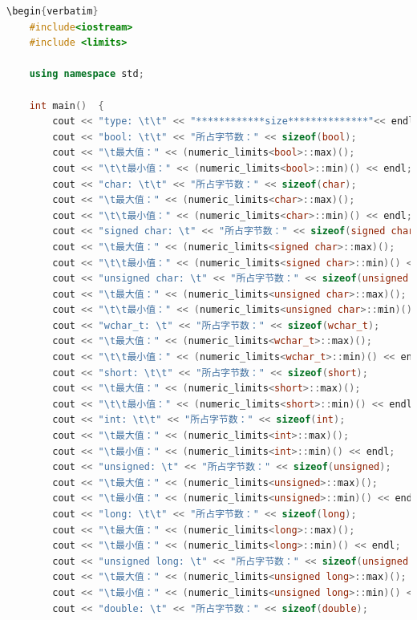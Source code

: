 \documentclass[12pt,twiside,a4paper]{ctexbook}
\numberwithin{chapter}{part}
\begin{document}
\begin{lstlisting}[language=C++]
\begin{verbatim}
    #include<iostream>  
    #include <limits>
     
    using namespace std;  
      
    int main()  {  
        cout << "type: \t\t" << "************size**************"<< endl;  
        cout << "bool: \t\t" << "所占字节数：" << sizeof(bool);  
        cout << "\t最大值：" << (numeric_limits<bool>::max)();  
        cout << "\t\t最小值：" << (numeric_limits<bool>::min)() << endl;  
        cout << "char: \t\t" << "所占字节数：" << sizeof(char);  
        cout << "\t最大值：" << (numeric_limits<char>::max)();  
        cout << "\t\t最小值：" << (numeric_limits<char>::min)() << endl;  
        cout << "signed char: \t" << "所占字节数：" << sizeof(signed char);  
        cout << "\t最大值：" << (numeric_limits<signed char>::max)();  
        cout << "\t\t最小值：" << (numeric_limits<signed char>::min)() << endl;  
        cout << "unsigned char: \t" << "所占字节数：" << sizeof(unsigned char);  
        cout << "\t最大值：" << (numeric_limits<unsigned char>::max)();  
        cout << "\t\t最小值：" << (numeric_limits<unsigned char>::min)() << endl;  
        cout << "wchar_t: \t" << "所占字节数：" << sizeof(wchar_t);  
        cout << "\t最大值：" << (numeric_limits<wchar_t>::max)();  
        cout << "\t\t最小值：" << (numeric_limits<wchar_t>::min)() << endl;  
        cout << "short: \t\t" << "所占字节数：" << sizeof(short);  
        cout << "\t最大值：" << (numeric_limits<short>::max)();  
        cout << "\t\t最小值：" << (numeric_limits<short>::min)() << endl;  
        cout << "int: \t\t" << "所占字节数：" << sizeof(int);  
        cout << "\t最大值：" << (numeric_limits<int>::max)();  
        cout << "\t最小值：" << (numeric_limits<int>::min)() << endl;  
        cout << "unsigned: \t" << "所占字节数：" << sizeof(unsigned);  
        cout << "\t最大值：" << (numeric_limits<unsigned>::max)();  
        cout << "\t最小值：" << (numeric_limits<unsigned>::min)() << endl;  
        cout << "long: \t\t" << "所占字节数：" << sizeof(long);  
        cout << "\t最大值：" << (numeric_limits<long>::max)();  
        cout << "\t最小值：" << (numeric_limits<long>::min)() << endl;  
        cout << "unsigned long: \t" << "所占字节数：" << sizeof(unsigned long);  
        cout << "\t最大值：" << (numeric_limits<unsigned long>::max)();  
        cout << "\t最小值：" << (numeric_limits<unsigned long>::min)() << endl;  
        cout << "double: \t" << "所占字节数：" << sizeof(double);  

\end{lstlisting}
\end{document}
